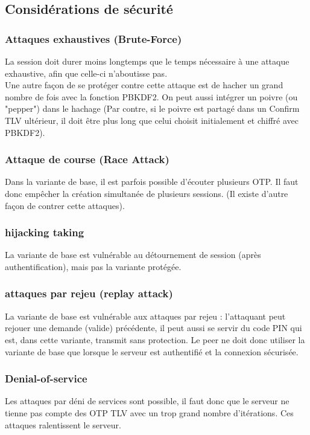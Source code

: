 \documentclass{../res/univ-projet}
\begin{document}
\subsection{Considérations de sécurité}

\subsubsection{Attaques exhaustives (Brute-Force)}
    La session doit durer moins longtemps que le temps nécessaire à une attaque exhaustive, afin que celle-ci n'aboutisse pas.\\
Une autre façon de se protéger contre cette attaque est de hacher un grand nombre de fois avec la fonction PBKDF2.
On peut aussi intégrer un poivre (ou "pepper") dans le hachage (Par contre, si le poivre est partagé dans un Confirm TLV ultérieur, il doit être plus long que celui choisit initialement et chiffré avec PBKDF2).

\subsubsection{Attaque de course (Race Attack)}
Dans la variante de base, il est parfois possible d'écouter plusieurs OTP.
Il faut donc empêcher la création simultanée de plusieurs sessions. (Il existe d'autre façon de contrer cette attaques).

\subsubsection{hijacking taking}
La variante de base est vulnérable au détournement de session (après authentification), mais pas la variante protégée.

\subsubsection{attaques par rejeu (replay attack)}
La variante de base est vulnérable aux attaques par rejeu : l'attaquant peut rejouer une demande (valide) précédente, il peut aussi se servir du code PIN qui est, dans cette variante, transmit sans protection.
Le peer ne doit donc utiliser la variante de base que lorsque le serveur est authentifié et la connexion sécurisée.

\subsubsection{Denial-of-service}
 Les attaques par déni de services sont possible, il faut donc que le serveur ne tienne pas compte des OTP TLV avec un trop grand nombre d'itérations.
Ces attaques ralentissent le serveur.
\end{document}
